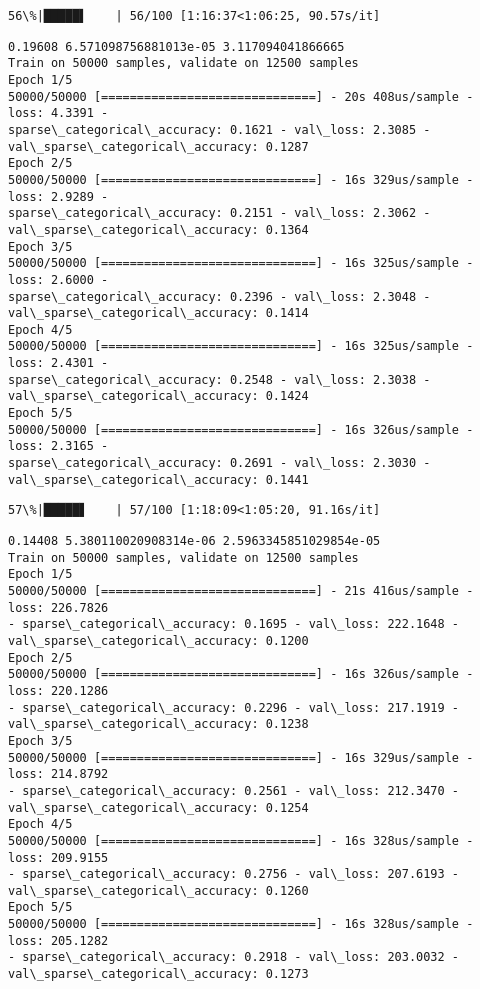 \documentclass[11pt]{article}
\begin{document}
    \begin{Verbatim}[commandchars=\\\{\}]
 56\%|█████▌    | 56/100 [1:16:37<1:06:25, 90.57s/it]
    \end{Verbatim}

    \begin{Verbatim}[commandchars=\\\{\}]
0.19608 6.571098756881013e-05 3.117094041866665
Train on 50000 samples, validate on 12500 samples
Epoch 1/5
50000/50000 [==============================] - 20s 408us/sample - loss: 4.3391 -
sparse\_categorical\_accuracy: 0.1621 - val\_loss: 2.3085 -
val\_sparse\_categorical\_accuracy: 0.1287
Epoch 2/5
50000/50000 [==============================] - 16s 329us/sample - loss: 2.9289 -
sparse\_categorical\_accuracy: 0.2151 - val\_loss: 2.3062 -
val\_sparse\_categorical\_accuracy: 0.1364
Epoch 3/5
50000/50000 [==============================] - 16s 325us/sample - loss: 2.6000 -
sparse\_categorical\_accuracy: 0.2396 - val\_loss: 2.3048 -
val\_sparse\_categorical\_accuracy: 0.1414
Epoch 4/5
50000/50000 [==============================] - 16s 325us/sample - loss: 2.4301 -
sparse\_categorical\_accuracy: 0.2548 - val\_loss: 2.3038 -
val\_sparse\_categorical\_accuracy: 0.1424
Epoch 5/5
50000/50000 [==============================] - 16s 326us/sample - loss: 2.3165 -
sparse\_categorical\_accuracy: 0.2691 - val\_loss: 2.3030 -
val\_sparse\_categorical\_accuracy: 0.1441
    \end{Verbatim}

    \begin{Verbatim}[commandchars=\\\{\}]
 57\%|█████▋    | 57/100 [1:18:09<1:05:20, 91.16s/it]
    \end{Verbatim}

    \begin{Verbatim}[commandchars=\\\{\}]
0.14408 5.380110020908314e-06 2.5963345851029854e-05
Train on 50000 samples, validate on 12500 samples
Epoch 1/5
50000/50000 [==============================] - 21s 416us/sample - loss: 226.7826
- sparse\_categorical\_accuracy: 0.1695 - val\_loss: 222.1648 -
val\_sparse\_categorical\_accuracy: 0.1200
Epoch 2/5
50000/50000 [==============================] - 16s 326us/sample - loss: 220.1286
- sparse\_categorical\_accuracy: 0.2296 - val\_loss: 217.1919 -
val\_sparse\_categorical\_accuracy: 0.1238
Epoch 3/5
50000/50000 [==============================] - 16s 329us/sample - loss: 214.8792
- sparse\_categorical\_accuracy: 0.2561 - val\_loss: 212.3470 -
val\_sparse\_categorical\_accuracy: 0.1254
Epoch 4/5
50000/50000 [==============================] - 16s 328us/sample - loss: 209.9155
- sparse\_categorical\_accuracy: 0.2756 - val\_loss: 207.6193 -
val\_sparse\_categorical\_accuracy: 0.1260
Epoch 5/5
50000/50000 [==============================] - 16s 328us/sample - loss: 205.1282
- sparse\_categorical\_accuracy: 0.2918 - val\_loss: 203.0032 -
val\_sparse\_categorical\_accuracy: 0.1273
    \end{Verbatim}
\end{document}
